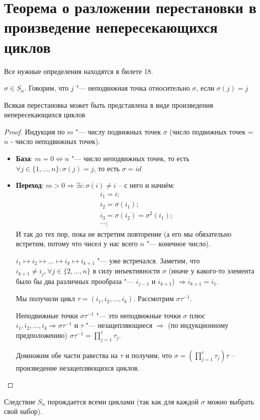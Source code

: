 \section{Теорема о разложении перестановки в произведение непересекающихся циклов}

Все нужные определения находятся в билете 18.

\begin{Def}
	$\sigma \in S_n$. Говорим, что $j$ "--- неподвижная точка относительно $\sigma$, если $\sigma(j) = j$
\end{Def}

\begin{theorem}{Всякая перестановка может быть представлена в виде произведения непересекающихся циклов}
\end{theorem}
\begin{proof}
	Индукция по $m$ "--- числу подвижных точек $\sigma$ (число подвижных точек = $n$ - число неподвижных точек).
	\begin{itemize}
\item \textbf{База}: $m = 0 \Leftrightarrow n $ "--- число неподвижных точек, то есть $\forall j \in \{1, \dotsc, n\} \colon \sigma(j) = j$, то есть $\sigma = id$
\item \textbf{Переход}: $m > 0 \Rightarrow \exists i\colon \sigma(i) \ne i$ -- с него и начнём:
\begin{gather*}
i_1 = i; \\
i_2 = \sigma(i_1); \\
i_3 = \sigma(i_2) = \sigma^2(i_1); \\
\dotsb;
\end{gather*}
И так до тех пор, пока не встретим повторение (а его мы обязательно встретим, потому что чисел у нас всего $n$ "--- конечное число).

$i_1 \mapsto i_2 \mapsto \dotsc \mapsto i_k \mapsto i_{k+1}$ "--- уже встречался.
Заметим, что $i_{k+1} \ne i_j, \forall j \in \{2, \dotsc, n\}$ в силу инъективности $\sigma$ (иначе у какого-то элемента было бы два различных прообраза "--- $i_{j-1}$ и $i_{k+1}$) $\Rightarrow i_{k+1} = i_1$.

Мы получили цикл $\tau = (i_1, i_2, \dotsc, i_k)$. Рассмотрим $\sigma\tau^{-1}$. 

Неподвижные точки $\sigma\tau^{-1}$ "--- это неподвижные точки $\sigma $ плюс $i_1, i_2, \dotsc, i_k \Rightarrow \sigma\tau^{-1}$ и $\tau$ "--- незацепляющиеся $\Rightarrow$ (по индукционному предположению) $\sigma\tau^{-1} = \prod_{j = 1}^r \tau_j$. 

Домножим обе части равества на $\tau$ и получим, что $\sigma = (\prod_{j = 1}^r \tau_j)\tau$ -- произведение незацепляющихся циклов.\\
\end{itemize}
\end{proof}
\begin{theorem}{Следствие}
$S_n$ порождается всеми циклами (так как для каждой $\sigma$ можно выбрать свой набор).
\end{theorem}

